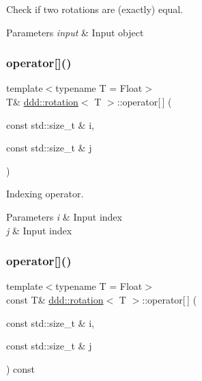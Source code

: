 Check if two rotations are (exactly) equal. 


\begin{DoxyParams}{Parameters}
{\em input} & Input object \\
\hline
\end{DoxyParams}
\mbox{\label{classddd_1_1rotation_a25411622296849f461c6f15aeaf280a0}} 
\subsubsection{\texorpdfstring{operator[]()}{operator[]()}\hspace{0.1cm}{\footnotesize\ttfamily [1/2]}}
{\footnotesize\ttfamily template$<$typename T  = Float$>$ \\
T\& \hyperlink{classddd_1_1rotation}{ddd\+::rotation}$<$ T $>$\+::operator\mbox{[}$\,$\mbox{]} (\begin{DoxyParamCaption}\item[{const std\+::size\+\_\+t \&}]{i,  }\item[{const std\+::size\+\_\+t \&}]{j }\end{DoxyParamCaption})\hspace{0.3cm}{\ttfamily [inline]}}



Indexing operator. 


\begin{DoxyParams}{Parameters}
{\em i} & Input index \\
\hline
{\em j} & Input index \\
\hline
\end{DoxyParams}
\mbox{\label{classddd_1_1rotation_abe1b800d2857b75ad2d00de4743bfa85}} 
\subsubsection{\texorpdfstring{operator[]()}{operator[]()}\hspace{0.1cm}{\footnotesize\ttfamily [2/2]}}
{\footnotesize\ttfamily template$<$typename T  = Float$>$ \\
const T\& \hyperlink{classddd_1_1rotation}{ddd\+::rotation}$<$ T $>$\+::operator\mbox{[}$\,$\mbox{]} (\begin{DoxyParamCaption}\item[{const std\+::size\+\_\+t \&}]{i,  }\item[{const std\+::size\+\_\+t \&}]{j }\end{DoxyParamCaption}) const\hspace{0.3cm}{\ttfamily [inline]}}



